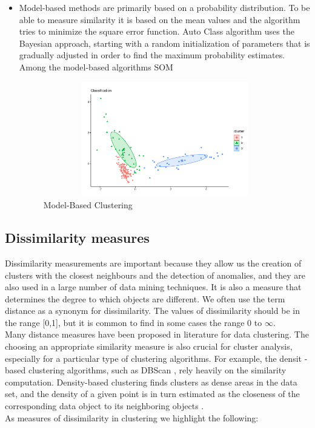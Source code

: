 \begin{itemize}
  \item Model-based methods are primarily based on a probability distribution. To be able to measure similarity it is based on the mean values and the algorithm tries to minimize the square error function. Auto Class algorithm uses the Bayesian approach, starting with a random initialization of parameters that is gradually adjusted in order to find the maximum probability estimates. Among the model-based algorithms SOM \cite{b34}
    \begin{figure}[htbp]
  \centering
   \includegraphics[width=14cm, height=5cm]{img/model}
    \caption{Model-Based Clustering}
    \label{fig:model}%
\end{figure}
\end{itemize}

\subsection*{Dissimilarity measures}

Dissimilarity measurements are important because they allow us the creation of clusters with the closest neighbours and the detection of anomalies, and they are also used in a large number of data mining techniques. It is also a measure that determines the degree to which objects are different. We often use the term distance as a synonym for dissimilarity. The values of dissimilarity should be in the range [0,1], but it is common to find in some cases the range 0 to $\infty$.
\\
Many distance measures have been proposed in literature for data clustering. The choosing an appropriate similarity measure is also crucial for cluster analysis, especially for a particular type of clustering algorithms. For example, the densit -based clustering algorithms, such as DBScan \cite{b28}, rely heavily on the similarity computation. Density-based clustering finds clusters as dense areas in the data set, and the density of a given point is in turn estimated as the closeness of the corresponding data object to its neighboring objects \cite{b50} \cite{b51}.
\\
As measures of dissimilarity in clustering we highlight the following:

